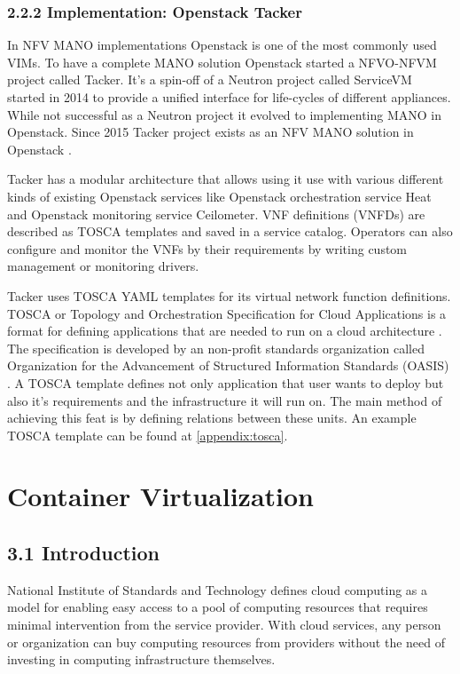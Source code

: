 \documentclass[12pt,oneandhalf,chaparabic,ceng,ms,eng,oneside,pntc]{gsufbe}
\begin{document}
\subsection[Implementation: Openstack Tacker]{2.2.2 Implementation: Openstack Tacker}
In NFV MANO implementations Openstack \cite{openstack} is one of the most commonly used VIMs.  To have
a complete MANO
solution Openstack started a NFVO-NFVM project called Tacker.  It's a spin-off of a Neutron project
called ServiceVM started in 2014 to provide a unified interface for life-cycles of different
appliances.  While not successful as a Neutron project it evolved to implementing MANO in Openstack.
Since 2015 Tacker project exists as an NFV MANO solution in Openstack \cite{tacker}.

Tacker has a modular architecture that allows using it use with various different kinds of
existing Openstack services like Openstack orchestration service Heat and Openstack monitoring service
Ceilometer.  VNF definitions (VNFDs) are described as TOSCA templates and saved in a service catalog.
Operators can also configure and monitor the VNFs by their requirements by writing custom management or
monitoring drivers.

Tacker uses TOSCA YAML templates for its virtual network function definitions.  TOSCA or Topology and
Orchestration Specification for Cloud Applications is a format for defining applications that are needed
to run on a cloud architecture \cite{oasis_tosca}.  The specification is developed by an non-profit
standards organization
called Organization for the Advancement of Structured Information Standards (OASIS) \cite{oasis}.
A TOSCA template defines not only application that user wants to deploy but also
it's requirements and the infrastructure it will run on.  The main method of achieving
this feat is by defining relations between these units.  An example TOSCA template can be found at
\ref{appendix:tosca}.


\chapter{Container Virtualization}
\section[Introduction]{3.1 Introduction}
National Institute of Standards and Technology defines cloud computing as a model for enabling
easy access to a pool of computing resources that requires minimal intervention from the service
provider.  With cloud services, any person or organization can buy computing resources from providers
without the need of investing in computing infrastructure themselves.  
\end{document}
